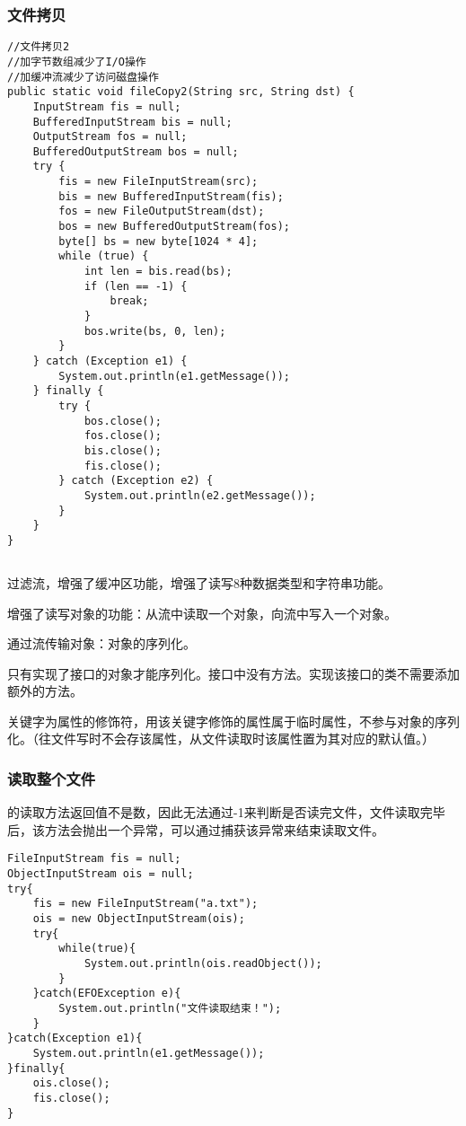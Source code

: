 \documentclass[a4paper]{report}
\begin{document}
\subsubsection{文件拷贝}
\begin{lstlisting}[title=使用缓冲流拷贝文件]
//文件拷贝2
//加字节数组减少了I/O操作
//加缓冲流减少了访问磁盘操作
public static void fileCopy2(String src, String dst) {
    InputStream fis = null;
    BufferedInputStream bis = null;
    OutputStream fos = null;
    BufferedOutputStream bos = null;
    try {
        fis = new FileInputStream(src);
        bis = new BufferedInputStream(fis);
        fos = new FileOutputStream(dst);
        bos = new BufferedOutputStream(fos);
        byte[] bs = new byte[1024 * 4];
        while (true) {
            int len = bis.read(bs);
            if (len == -1) {
                break;
            }
            bos.write(bs, 0, len);
        }
    } catch (Exception e1) {
        System.out.println(e1.getMessage());
    } finally {
        try {
            bos.close();
            fos.close();
            bis.close();
            fis.close();
        } catch (Exception e2) {
            System.out.println(e2.getMessage());
        }
    }
}
\end{lstlisting}

\subsection{}
过滤流，增强了缓冲区功能，增强了读写8种数据类型和字符串功能。

增强了读写对象的功能：从流中读取一个对象，向流中写入一个对象。

\begin{tips}
通过流传输对象：对象的序列化。

只有实现了接口的对象才能序列化。接口中没有方法。实现该接口的类不需要添加额外的方法。

关键字为属性的修饰符，用该关键字修饰的属性属于临时属性，不参与对象的序列化。（往文件写时不会存该属性，从文件读取时该属性置为其对应的默认值。）
\end{tips}

\subsubsection{读取整个文件}
的读取方法返回值不是数，因此无法通过-1来判断是否读完文件，文件读取完毕后，该方法会抛出一个异常，可以通过捕获该异常来结束读取文件。
\begin{lstlisting}
FileInputStream fis = null;
ObjectInputStream ois = null;
try{
    fis = new FileInputStream("a.txt");
    ois = new ObjectInputStream(ois);
    try{
        while(true){
            System.out.println(ois.readObject());
        }
    }catch(EFOException e){
        System.out.println("文件读取结束！");
    }
}catch(Exception e1){
    System.out.println(e1.getMessage());
}finally{
    ois.close();
    fis.close();
}
\end{lstlisting}
\end{document}
